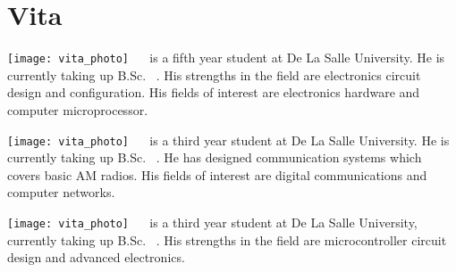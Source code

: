 \chapter{Vita}


\texttt{[image: vita\_photo]}
 \  \ is a fifth year student at De La Salle University. He is currently taking up B.Sc. \degree \ . His strengths in the field are electronics circuit design and configuration. His fields of interest are electronics hardware and computer microprocessor.


\texttt{[image: vita\_photo]}
 \  \ is a third year student at De La Salle University. He is currently taking up B.Sc. \degree \ . He has designed communication systems which covers basic AM radios. His fields of interest are digital communications and computer networks.


\texttt{[image: vita\_photo]}
 \  \ is a third year student at De La Salle University, currently taking up B.Sc. \degree \ .  His strengths in the field are microcontroller circuit design and advanced electronics.

